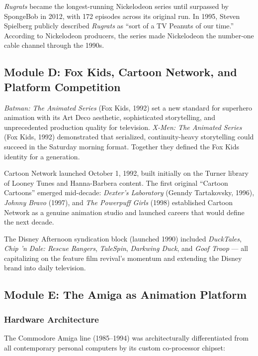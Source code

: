 \documentclass[11pt,letterpaper]{article}
\begin{document}
\textit{Rugrats} became the longest-running Nickelodeon series until surpassed by SpongeBob in 2012, with 172 episodes across its original run. In 1995, Steven Spielberg publicly described \textit{Rugrats} as ``sort of a TV Peanuts of our time.'' According to Nickelodeon producers, the series made Nickelodeon the number-one cable channel through the 1990s.

\subsection{Module D: Fox Kids, Cartoon Network, and Platform Competition}

\textit{Batman: The Animated Series} (Fox Kids, 1992) set a new standard for superhero animation with its Art Deco aesthetic, sophisticated storytelling, and unprecedented production quality for television. \textit{X-Men: The Animated Series} (Fox Kids, 1992) demonstrated that serialized, continuity-heavy storytelling could succeed in the Saturday morning format. Together they defined the Fox Kids identity for a generation.

Cartoon Network launched October 1, 1992, built initially on the Turner library of Looney Tunes and Hanna-Barbera content. The first original ``Cartoon Cartoons'' emerged mid-decade: \textit{Dexter's Laboratory} (Genndy Tartakovsky, 1996), \textit{Johnny Bravo} (1997), and \textit{The Powerpuff Girls} (1998) established Cartoon Network as a genuine animation studio and launched careers that would define the next decade.

The Disney Afternoon syndication block (launched 1990) included \textit{DuckTales}, \textit{Chip 'n Dale: Rescue Rangers}, \textit{TaleSpin}, \textit{Darkwing Duck}, and \textit{Goof Troop} --- all capitalizing on the feature film revival's momentum and extending the Disney brand into daily television.

\subsection{Module E: The Amiga as Animation Platform}

\subsubsection{Hardware Architecture}

The Commodore Amiga line (1985--1994) was architecturally differentiated from all contemporary personal computers by its custom co-processor chipset:
\end{document}
